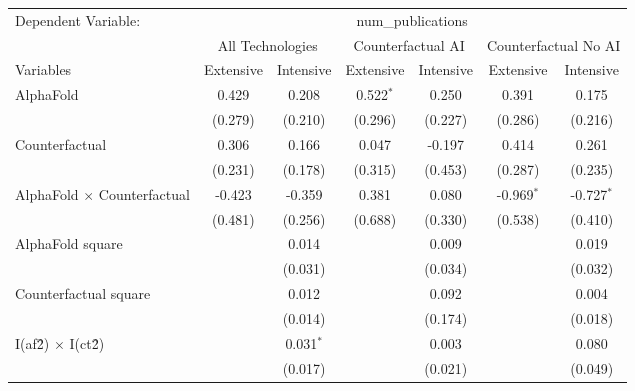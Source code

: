 \begingroup
\centering
\begin{tabular}{lcccccc}
   \tabularnewline \midrule \midrule
   Dependent Variable: & \multicolumn{6}{c}{num\_publications}\\
 & \multicolumn{2}{c}{All Technologies} & \multicolumn{2}{c}{Counterfactual AI} & \multicolumn{2}{c}{Counterfactual No AI} \\
\cmidrule(lr){1-1}\cmidrule(lr){2-3} \cmidrule(lr){4-5} \cmidrule(lr){6-7}
Variables & \multicolumn{1}{c}{Extensive} & \multicolumn{1}{c}{Intensive} & \multicolumn{1}{c}{Extensive} & \multicolumn{1}{c}{Intensive} & \multicolumn{1}{c}{Extensive} & \multicolumn{1}{c}{Intensive} \\
\cmidrule(lr){1-1}\cmidrule(lr){2-2} \cmidrule(lr){3-3} \cmidrule(lr){4-4} \cmidrule(lr){5-5} \cmidrule(lr){6-6} \cmidrule(lr){7-7}
   AlphaFold                          & 0.429   & 0.208       & 0.522$^{*}$ & 0.250   & 0.391        & 0.175\\   
                                      & (0.279) & (0.210)     & (0.296)     & (0.227) & (0.286)      & (0.216)\\   
   Counterfactual                     & 0.306   & 0.166       & 0.047       & -0.197  & 0.414        & 0.261\\   
                                      & (0.231) & (0.178)     & (0.315)     & (0.453) & (0.287)      & (0.235)\\   
   AlphaFold $\times$ Counterfactual  & -0.423  & -0.359      & 0.381       & 0.080   & -0.969$^{*}$ & -0.727$^{*}$\\   
                                      & (0.481) & (0.256)     & (0.688)     & (0.330) & (0.538)      & (0.410)\\   
   AlphaFold square                   &         & 0.014       &             & 0.009   &              & 0.019\\   
                                      &         & (0.031)     &             & (0.034) &              & (0.032)\\   
   Counterfactual square              &         & 0.012       &             & 0.092   &              & 0.004\\   
                                      &         & (0.014)     &             & (0.174) &              & (0.018)\\   
   I(af\^2) $\times$ I(ct\^2)         &         & 0.031$^{*}$ &             & 0.003   &              & 0.080\\   
                                      &         & (0.017)     &             & (0.021) &              & (0.049)\\   

\end{tabular}
